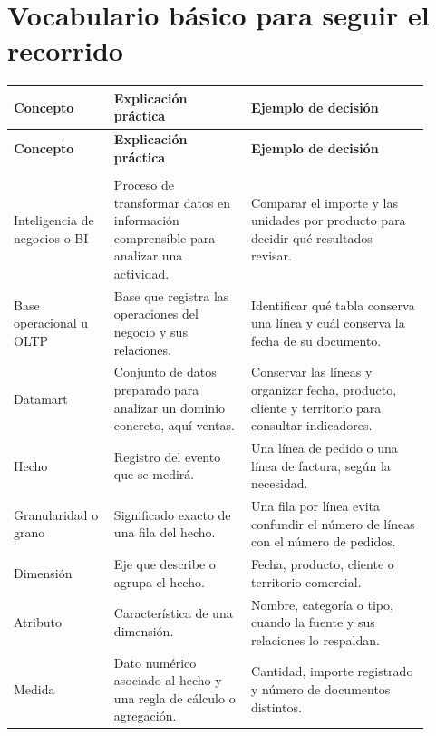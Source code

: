 \section{Vocabulario básico para seguir el recorrido}
\begingroup
\fontsize{10}{12.5}\selectfont
\setlength{\tabcolsep}{5pt}
\renewcommand{\arraystretch}{1.15}
\begin{longtable}{@{}>{\RaggedRight\arraybackslash}p{0.22\linewidth}>{\RaggedRight\arraybackslash}p{0.3\linewidth}>{\RaggedRight\arraybackslash}p{0.39\linewidth}@{}}
\toprule
\textbf{Concepto} & \textbf{Explicación práctica} & \textbf{Ejemplo de decisión} \\
\midrule
\endfirsthead
\toprule
\textbf{Concepto} & \textbf{Explicación práctica} & \textbf{Ejemplo de decisión} \\
\midrule
\endhead
\midrule
\multicolumn{3}{r}{\footnotesize Continúa en la página siguiente}\\
\endfoot
\bottomrule
\endlastfoot
Inteligencia de negocios o BI & Proceso de transformar datos en información comprensible para analizar una actividad. & Comparar el importe y las unidades por producto para decidir qué resultados revisar. \\
\addlinespace[3pt]
Base operacional u OLTP & Base que registra las operaciones del negocio y sus relaciones. & Identificar qué tabla conserva una línea y cuál conserva la fecha de su documento. \\
\addlinespace[3pt]
Datamart & Conjunto de datos preparado para analizar un dominio concreto, aquí ventas. & Conservar las líneas y organizar fecha, producto, cliente y territorio para consultar indicadores. \\
\addlinespace[3pt]
Hecho & Registro del evento que se medirá. & Una línea de pedido o una línea de factura, según la necesidad. \\
\addlinespace[3pt]
Granularidad o grano & Significado exacto de una fila del hecho. & Una fila por línea evita confundir el número de líneas con el número de pedidos. \\
\addlinespace[3pt]
Dimensión & Eje que describe o agrupa el hecho. & Fecha, producto, cliente o territorio comercial. \\
\addlinespace[3pt]
Atributo & Característica de una dimensión. & Nombre, categoría o tipo, cuando la fuente y sus relaciones lo respaldan. \\
\addlinespace[3pt]
Medida & Dato numérico asociado al hecho y una regla de cálculo o agregación. & Cantidad, importe registrado y número de documentos distintos. \\

\end{longtable}

